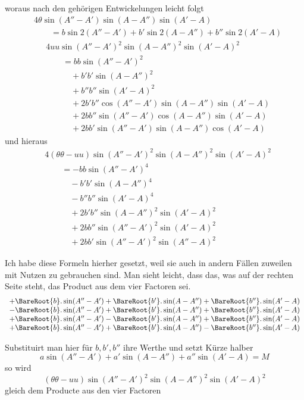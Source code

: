 %
woraus nach den gehörigen Entwickelungen leicht folgt
\[
\begin{aligned}
&4\theta\sin(A''-A')\sin(A-A'')\sin(A'-A)\\
&\qquad=b\sin2(A''-A')+b'\sin2(A-A'')+b''\sin2(A'-A)
\end{aligned}
\]
\[
\begin{aligned}
&4uu\sin(A''-A')^2\sin(A-A'')^2\sin(A'-A)^2\\
&\qquad=bb\sin(A''-A')^2\\
&\qquad\quad+b'b'\sin(A-A'')^2\\
&\qquad\quad+b''b''\sin(A'-A)^2\\
&\qquad\quad+2b'b''\cos(A''-A')\sin(A-A'')\sin(A'-A)\\
&\qquad\quad+2bb''\sin(A''-A')\cos(A-A'')\sin(A'-A)\\
&\qquad\quad+2bb'\sin(A''-A')\sin(A-A'')\cos(A'-A)
\end{aligned}
\]
und hieraus
\[
\begin{aligned}
&4(\theta\theta-uu)\sin(A''-A')^2\sin(A-A'')^2\sin(A'-A)^2\\
&\qquad=-bb\sin(A''-A')^4\\
&\qquad\quad-b'b'\sin(A-A'')^4\\
&\qquad\quad-b''b''\sin(A'-A)^4\\
&\qquad\quad+2b'b''\sin(A-A'')^2\sin(A'-A)^2\\
&\qquad\quad+2bb''\sin(A''-A')^2\sin(A'-A)^2\\
&\qquad\quad+2bb'\sin(A''-A')^2\sin(A''-A)^2
\end{aligned}
\]
\par
Ich habe diese Formeln hierher gesetzt, weil sie auch in andern Fällen zuweilen mit Nutzen zu gebrauchen sind. Man sieht leicht, dass das, was auf der rechten Seite steht, das Product aus dem vier Factoren sei.
\[
\begin{array}{l}
+\BareRoot{b}.\sin(A''-A')+\BareRoot{b'}.\sin(A-A'')+\BareRoot{b''}.\sin(A'-A)\\
-\BareRoot{b}.\sin(A''-A')+\BareRoot{b'}.\sin(A-A'')+\BareRoot{b''}.\sin(A'-A)\\
+\BareRoot{b}.\sin(A''-A')-\BareRoot{b'}.\sin(A-A'')+\BareRoot{b''}.\sin(A'-A)\\
+\BareRoot{b}.\sin(A''-A')+\BareRoot{b'}.\sin(A-A'')-\BareRoot{b''}.\sin(A'-A)
\end{array}
\]
\par
Substituirt man hier für \(b,b',b''\) ihre Werthe und setzt Kürze halber
\[
a\sin(A''-A')+a'\sin(A-A'')+a''\sin(A'-A)=M
\]
so wird
\[
(\theta\theta-uu)\sin(A''-A')^2\sin(A-A'')^2\sin(A'-A)^2
\]
gleich dem Producte aus den vier Factoren
